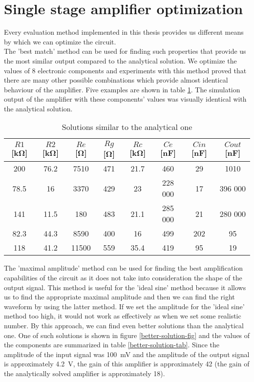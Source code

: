 \section{Single stage amplifier optimization} \label{single-stage-results}
Every evaluation method implemented in this thesis provides us different means by which we can optimize the circuit.\\
The 'best match' method can be used for finding such properties that provide us the most similar output compared to the analytical solution. We optimize the values of 8 electronic components and experiments with this method proved that there are many other possible combinations which provide almost identical behaviour of the amplifier. Five examples are shown in table \ref{best-fit-solutions}. The simulation output of the amplifier with these components' values was visually identical with the analytical solution.\\

\begin{table}[H]
\centering
\begin{tabular}{@{}c ccccccc@{}}
\toprule
    $R1$ [\si{\kilo\ohm}] & $R2$ [\si{\kilo\ohm}] & $Re$ [\si{\ohm}] & $Rg$ [\si{\ohm}] & $Rc$ [\si{\kilo\ohm}] & $Ce$ [\si{\nano\farad}] & $Cin$ [\si{\nano\farad}] & $Cout$ [\si{\nano\farad}] \\
    \midrule
    200   & 76.2 & 7510  & 471 & 21.7 & 460     & 29    & 1010 \\
    78.5  & 16   & 3370  & 429 & 23   & 228 000 & 17    & 396 000 \\
    141   & 11.5 & 180   & 483 & 21.1 & 285 000 & 21    & 280 000 \\
    82.3  & 44.3 & 8590  & 400 & 16   & 499     & 202   & 95 \\
    118   & 41.2 & 11500 & 559 & 35.4 & 419     & 95    & 19 \\
    \bottomrule
\end{tabular}
\caption{Solutions similar to the analytical one}
\label{best-fit-solutions}
\end{table}

The 'maximal amplitude' method can be used for finding the best amplification capabilities of the circuit as it does not take into consideration the shape of the output signal. This method is useful for the 'ideal sine' method because it allows us to find the appropriate maximal amplitude and then we can find the right waveform by using the latter method. If we set the amplitude for the 'ideal sine' method too high, it would not work as effectively as when we set some realistic number. By this approach, we can find even better solutions than the analytical one. One of such solutions is shown in figure \ref{better-solution-fig} and the values of the components are summarized in table \ref{better-solution-tab}. Since the amplitude of the input signal was \SI{100}{\milli\volt} and the amplitude of the output signal is approximately \SI{4.2}{\volt}, the gain of this amplifier is approximately 42 (the gain of the analytically solved amplifier is approximately 18).\\

